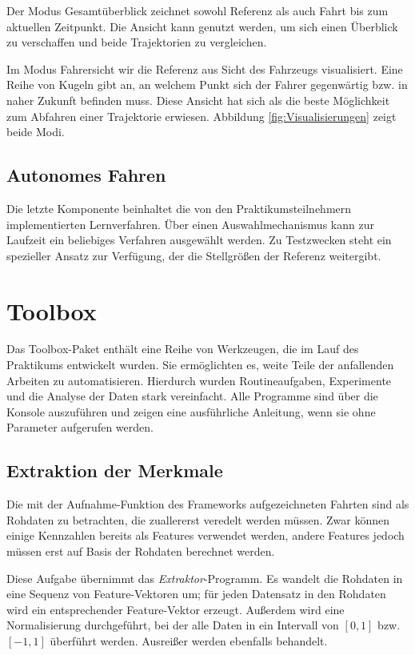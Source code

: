 Der Modus Gesamtüberblick zeichnet sowohl Referenz als auch Fahrt bis zum aktuellen Zeitpunkt. Die Ansicht kann genutzt werden, um sich einen Überblick zu verschaffen und beide Trajektorien zu vergleichen.

Im Modus Fahrersicht wir die Referenz aus Sicht des Fahrzeugs visualisiert. Eine Reihe von Kugeln gibt an, an welchem Punkt sich der Fahrer gegenwärtig bzw. in naher Zukunft befinden muss. Diese Ansicht hat sich als die beste Möglichkeit zum Abfahren einer Trajektorie erwiesen. Abbildung \ref{fig:Visualisierungen} zeigt beide Modi.

\subsection{Autonomes Fahren}
\label{subsec:AutonomesFahren}
Die letzte Komponente beinhaltet die von den Praktikumsteilnehmern implementierten Lernverfahren. Über einen Auswahlmechanismus kann zur Laufzeit ein beliebiges Verfahren ausgewählt werden. Zu Testzwecken steht ein spezieller Ansatz zur Verfügung, der die Stellgrößen der Referenz weitergibt.


\section{Toolbox} %
\label{sub:Toolbox}
Das Toolbox-Paket enthält eine Reihe von Werkzeugen, die im Lauf des Praktikums entwickelt wurden. Sie ermöglichten es, weite Teile der anfallenden Arbeiten zu automatisieren. Hierdurch wurden Routineaufgaben, Experimente und die Analyse der Daten stark vereinfacht.
Alle Programme sind über die Konsole auszuführen und zeigen eine ausführliche Anleitung, wenn sie ohne Parameter aufgerufen werden. 

\subsection{Extraktion der Merkmale}
\label{subsec:ExtraktionDerMerkmale}
Die mit der Aufnahme-Funktion des Frameworks aufgezeichneten Fahrten sind als Rohdaten zu betrachten, die zuallererst veredelt werden müssen. Zwar können einige Kennzahlen bereits als Features verwendet werden, andere Features jedoch müssen erst auf Basis der Rohdaten berechnet werden.

Diese Aufgabe übernimmt das \textit{Extraktor}-Programm. Es wandelt die Rohdaten in eine Sequenz von Feature-Vektoren um; für jeden Datensatz in den Rohdaten wird ein entsprechender Feature-Vektor erzeugt. Außerdem wird eine Normalisierung durchgeführt, bei der alle Daten in ein Intervall von $[0,1]$ bzw. $[-1,1]$ überführt werden. Ausreißer werden ebenfalls behandelt.

